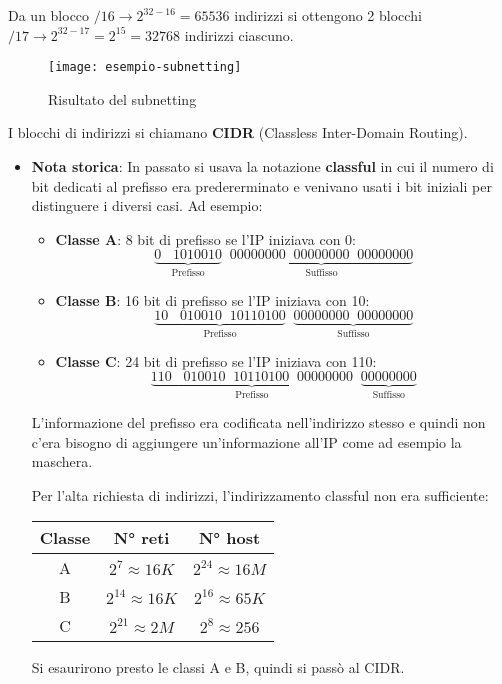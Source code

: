 \documentclass[a4paper]{article}
\begin{document}
\vspace{1em}
\noindent
Da un blocco \( /16 \to 2^{32-16} = 65536 \) indirizzi si ottengono 2 blocchi
\( /17 \to 2^{32-17} = 2^{15} = 32768 \) indirizzi ciascuno.
\begin{figure}[H]
  \centering
  \texttt{[image: esempio-subnetting]}
  \caption{Risultato del subnetting}
\end{figure}

\noindent
I blocchi di indirizzi si chiamano \textbf{CIDR} (Classless Inter-Domain Routing).

\begin{itemize}
  \item \textbf{Nota storica}: In passato si usava la notazione \textbf{classful} in cui
    il numero di bit dedicati al prefisso era predererminato e venivano usati i bit
    iniziali per distinguere i diversi casi. Ad esempio:
    \begin{itemize}
      \item \textbf{Classe A}: 8 bit di prefisso se l'IP iniziava con 0:
        \[
          \underbrace{0 \;\;\; 1010010}_{\text{Prefisso}} \;\; \underbrace{00000000 \;\; 00000000 \;\; 00000000}_{\text{Suffisso}}
        \] 
      \item \textbf{Classe B}: 16 bit di prefisso se l'IP iniziava con 10:
        \[
          \underbrace{10 \;\;\; 010010 \;\; 10110100}_{\text{Prefisso}} \;\; \underbrace{00000000 \;\; 00000000}_{\text{Suffisso}}
        \]
      \item \textbf{Classe C}: 24 bit di prefisso se l'IP iniziava con 110:
        \[
          \underbrace{110 \;\;\; 010010 \;\; 10110100 \;\; 00000000}_{\text{Prefisso}} \;\; \underbrace{00000000}_{\text{Suffisso}}
        \]
    \end{itemize}
    L'informazione del prefisso era codificata nell'indirizzo stesso e quindi non c'era
    bisogno di aggiungere un'informazione all'IP come ad esempio la maschera.

    Per l'alta richiesta di indirizzi, l'indirizzamento classful non era sufficiente:
    \begin{table}[H]
      \centering
      \begin{tabular}{c|c|c}
        Classe & N° reti              & N° host              \\
        \hline
             A & $2^{7} \approx 16K$  & $2^{24} \approx 16M$ \\
             B & $2^{14} \approx 16K$ & $2^{16} \approx 65K$ \\
             C & $2^{21} \approx 2M$  & $2^{8} \approx 256$  \\
      \end{tabular}
    \end{table}
    \noindent
    Si esaurirono presto le classi A e B, quindi si passò al CIDR.
\end{itemize}
\end{document}
